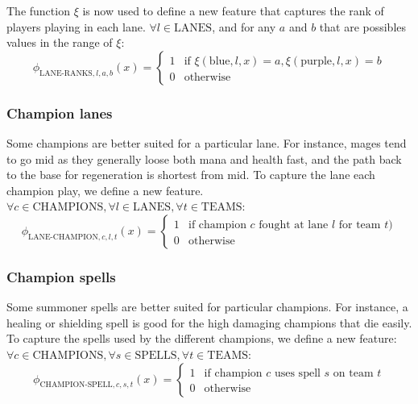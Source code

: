 The function $\xi$ is now used to define a new feature that captures the rank of players playing in each lane.
$\forall l \in \text{LANES}$, and for any $a$ and $b$ that are possibles values in the range of $\xi$:
\begin{equation}\label{eq:laneranks}
\phi_{\text{LANE-RANKS},l,a,b}(x) =
\begin{cases} 
  1 & \text{if } \xi(\text{blue},l,x) = a, \xi(\text{purple},l,x) = b\\
  0 & \text{otherwise} 
\end{cases}  
\end{equation}

\subsubsection{Champion lanes}
Some champions are better suited for a particular lane. For instance, mages tend to go mid as they generally loose both mana and health fast, and the path back to the base for regeneration is shortest from mid. To capture the lane each champion play, we define a new feature.
$\forall c \in \text{CHAMPIONS}, \forall l \in \text{LANES}, \forall t \in \text{TEAMS}$:
\begin{equation}\label{eq:championlane}
  \phi_{\text{LANE-CHAMPION},c,l,t}(x) =
\begin{cases}
  1 & \text{if champion } c \text{ fought at lane } l \text{ for team } t)\\
  0 & \text{otherwise}
\end{cases}
\end{equation}

\subsubsection{Champion spells}
Some summoner spells are better suited for particular champions. For instance, a healing or shielding spell is good for the high damaging champions that die easily.
To capture the spells used by the different champions, we define a new feature:
$\forall c \in \text{CHAMPIONS}, \forall s \in \text{SPELLS}, \forall t \in \text{TEAMS}$:
\begin{equation}\label{eq:championlane}
  \phi_{\text{CHAMPION-SPELL},c,s,t}(x) =
\begin{cases} 
  1 & \text{if champion } c \text{ uses spell } s \text{ on team } t\\
  0 & \text{otherwise} 
\end{cases}
\end{equation}

